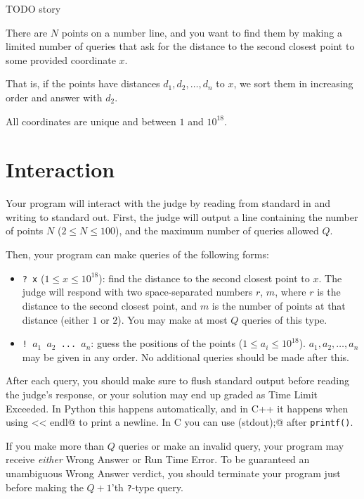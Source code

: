 TODO story

There are $N$ points on a number line, and you want to find them by making a limited number of queries that ask for the distance to the second closest point to some provided coordinate $x$.

That is, if the points have distances $d_1, d_2, \ldots, d_n$ to $x$, we sort them in increasing order and answer with $d_2$.

All coordinates are unique and between $1$ and $10^{18}$.

\section*{Interaction}
Your program will interact with the judge by reading from standard in and writing to standard out.
First, the judge will output a line containing the number of points $N$ ($2 \le N \le 100$), and the maximum number of queries allowed $Q$.

Then, your program can make queries of the following forms:

\begin{itemize}
  \item \texttt{? x} ($1 \le x \le 10^{18}$): find the distance to the second closest point to $x$.
    The judge will respond with two space-separated numbers $r$, $m$,
    where $r$ is the distance to the second closest point, and $m$ is the number of points at that distance (either $1$ or $2$).
    You may make at most $Q$ queries of this type.
  \item \texttt{! $a_1$ $a_2$ ... $a_n$}: guess the positions of the points ($1 \le a_i \le 10^{18}$).
    $a_1, a_2, \ldots, a_n$ may be given in any order.
    No additional queries should be made after this.
\end{itemize}

After each query, you should make sure to flush standard output before reading the judge's response, or your solution may end up graded as Time Limit Exceeded.
In Python this happens automatically, and in C++ it happens when using \verb@cout << endl@ to print a newline.
In C you can use \verb@fflush(stdout);@ after \texttt{printf()}.

If you make more than $Q$ queries or make an invalid query, your program may receive \emph{either} Wrong Answer or Run Time Error.
To be guaranteed an unambiguous Wrong Answer verdict, you should terminate your program just before making the $Q+1$'th \texttt{?}-type query.

